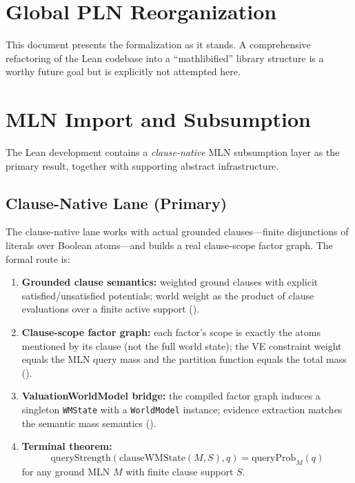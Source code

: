 \documentclass[11pt,openany]{report}
\begin{document}
\section{Global PLN Reorganization}

This document presents the formalization as it stands.  A comprehensive
refactoring of the Lean codebase into a ``mathlibified'' library
structure is a worthy future goal but is explicitly not attempted here.

\section{MLN Import and Subsumption}

The Lean development contains a \emph{clause-native} MLN subsumption
layer as the primary result, together with supporting abstract
infrastructure.

\subsection{Clause-Native Lane (Primary)}

The clause-native lane works with actual grounded clauses---finite
disjunctions of literals over Boolean atoms---and builds a real
clause-scope factor graph.  The formal route is:
\begin{enumerate}
\item \textbf{Grounded clause semantics:} weighted ground clauses with
  explicit satisfied/unsatisfied potentials; world weight as the product
  of clause evaluations over a finite active support
  ().
\item \textbf{Clause-scope factor graph:} each factor's scope is exactly
  the atoms mentioned by its clause (not the full world state); the VE
  constraint weight equals the MLN query mass and the partition function
  equals the total mass
  ().
\item \textbf{ValuationWorldModel bridge:} the compiled factor graph
  induces a singleton \texttt{WMState} with a \texttt{WorldModel} instance;
  evidence extraction matches the semantic mass semantics
  ().
\item \textbf{Terminal theorem:}
  \[
    \mathrm{queryStrength}(\mathrm{clauseWMState}(M, S), q)
      = \mathrm{queryProb}_{M}(q)
  \]
  for any ground MLN $M$ with finite clause support $S$.
\end{enumerate}
\end{document}
